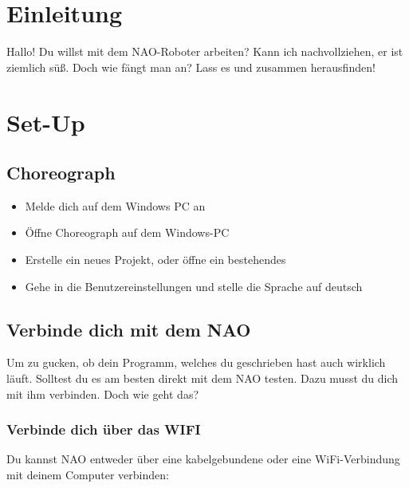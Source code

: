 \section{Einleitung}
Hallo!
Du willst mit dem NAO-Roboter arbeiten? Kann ich nachvollziehen, er ist ziemlich süß. Doch wie fängt man an? Lass es und zusammen herausfinden!

\section{Set-Up}
\subsection{Choreograph}
\begin{itemize}
    \item Melde dich auf dem Windows PC an
    \item Öffne Choreograph auf dem Windows-PC
    \item Erstelle ein neues Projekt, oder öffne ein bestehendes
    \item Gehe in die Benutzereinstellungen und stelle die Sprache auf deutsch %
\end{itemize}

\subsection{Verbinde dich mit dem NAO}
Um zu gucken, ob dein Programm, welches du geschrieben hast auch wirklich läuft. Solltest du es am besten direkt mit dem NAO testen. Dazu musst du dich mit ihm verbinden. Doch wie geht das?
\subsubsection{Verbinde dich über das WIFI}
Du kannst NAO entweder über eine kabelgebundene oder eine WiFi-Verbindung mit deinem Computer verbinden:

